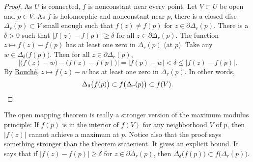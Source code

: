 \documentclass[12pt,openany]{book}
\newcommand{\sabs}[1]{\lvert {#1} \rvert}
\newcommand{\abs}[1]{\left\lvert {#1} \right\rvert}
\theoremstyle{plain}
\theoremstyle{remark}
\theoremstyle{definition}
\theoremstyle{exercise}
\theoremstyle{example}
\begin{document}
\begin{proof}
As $U$ is connected, $f$ is nonconstant
near every point.
Let $V \subset U$ be open and $p \in V$.
As $f$
is holomorphic and nonconstant near $p$,  
there is a closed disc $\overline{\Delta_r(p)} \subset V$ small enough such that
$f(z) \neq f(p)$ for $z \in \partial \Delta_r(p)$.
There is a $\delta > 0$ such
that $\abs{f(z)-f(p)} \geq \delta$ for all $z \in \partial \Delta_r(p)$.
The function $z \mapsto f(z)-f(p)$ has at least one zero in $\Delta_r(p)$
(at $p$).  Take any $w \in \Delta_{\delta}\bigl(f(p)\bigr)$.  Then for
all $z \in \partial \Delta_r(p)$,
\begin{equation*}
\abs{\bigl( f(z)-w \bigr) - \bigl( f(z)-f(p) \bigr)} = \abs{f(p)-w} <
\delta \leq \abs{f(z)-f(p)} .
\end{equation*}
By \hyperref[thm:rouche2]{Rouch\'e}, $z \mapsto f(z)-w$ has at least one
zero in $\Delta_r(p)$.
In other words,
\begin{equation*}
\Delta_{\delta}\bigl(f(p)\bigr) \subset
f\bigl(\Delta_r(p)\bigr) \subset f(V) .  \qedhere
\end{equation*}
\end{proof}

The open mapping theorem is really a stronger version of
the maximum modulus principle:
If $f(p)$ is in the interior of $f(V)$ for any neighborhood $V$ of
$p$, then $\sabs{f(z)}$ cannot achieve a maximum at $p$.
Notice also that the proof says something stronger than the theorem statement.  It
gives an explicit bound.  It says that if 
$\abs{f(z)-f(p)} \geq \delta$ for $z \in \partial \Delta_r(p)$,
then
$\Delta_{\delta}\bigl(f(p)\bigr) \subset f\bigl(\Delta_r(p)\bigr)$.
\end{document}
